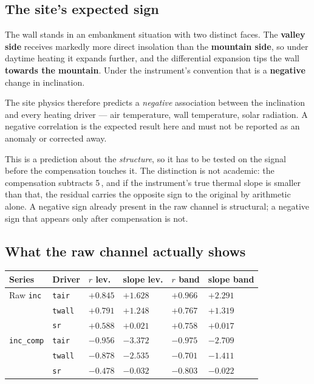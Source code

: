 \documentclass[11pt,a4paper]{article}
\begin{document}
\subsection{The site's expected sign}
\label{sec:sign}

The wall stands in an embankment situation with two distinct faces. The
\textbf{valley side} receives markedly more direct insolation than the
\textbf{mountain side}, so under daytime heating it expands further, and the
differential expansion tips the wall \textbf{towards the mountain}. Under the
instrument's convention that is a \textbf{negative} change in inclination.

The site physics therefore predicts a \emph{negative} association between the
inclination and every heating driver --- air temperature, wall temperature,
solar radiation. A negative correlation is the expected result here and must not
be reported as an anomaly or corrected away.

This is a prediction about the \emph{structure}, so it has to be tested on the
signal before the compensation touches it. The distinction is not academic: the
compensation subtracts 5\,\mdegC, and if the instrument's true thermal slope is
smaller than that, the residual carries the opposite sign to the original by
arithmetic alone. A negative sign already present in the raw channel is
structural; a negative sign that appears only after compensation is not.

\subsection{What the raw channel actually shows}
\label{sec:signtest}

\begin{center}
\small
\begin{tabular}{llR{1.4cm}R{1.7cm}R{1.4cm}R{1.7cm}}
\toprule
\textbf{Series} & \textbf{Driver} & \textbf{$r$ lev.} &
\textbf{slope lev.} & \textbf{$r$ band} & \textbf{slope band} \\
\midrule
Raw \texttt{inc}       & \texttt{tair}  & $+0.845$ & $+1.628$ & $+0.966$ & $+2.291$ \\
                       & \texttt{twall} & $+0.791$ & $+1.248$ & $+0.767$ & $+1.319$ \\
                       & \texttt{sr}    & $+0.588$ & $+0.021$ & $+0.758$ & $+0.017$ \\
\addlinespace
\texttt{inc\_comp}     & \texttt{tair}  & $-0.956$ & $-3.372$ & $-0.975$ & $-2.709$ \\
                       & \texttt{twall} & $-0.878$ & $-2.535$ & $-0.701$ & $-1.411$ \\
                       & \texttt{sr}    & $-0.478$ & $-0.032$ & $-0.803$ & $-0.022$ \\
\bottomrule
\end{tabular}
\end{center}
\end{document}
